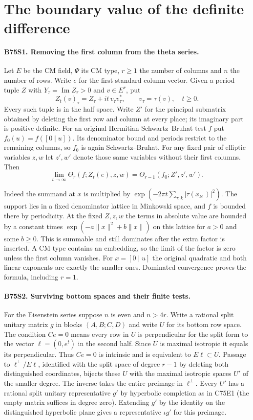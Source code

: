 \section{The boundary value of the definite difference}

\paragraph{B75S1. Removing the first column from the theta series.}
Let $E$ be the CM field, $\Psi$ its CM type, $r\ge1$ the number of
columns and $n$ the number of rows. Write $e$ for the first standard
column vector. Given a period tuple $Z$ with $Y_\tau=\operatorname{Im}
Z_\tau>0$ and $v\in E^r$, put
\[
   Z_t(v)_\tau=Z_\tau+it\,v_\tau v_\tau^*,\qquad
   v_\tau=\tau(v),\quad t\ge0.
\]
Every such tuple is in the half space. Write $Z'$ for the principal
submatrix obtained by deleting the first row and column at every place;
its imaginary part is positive definite. For an original Hermitian
Schwartz--Bruhat test $f$ put $f_0(u)=f([0\mid u])$. Its denominator
bound and periods restrict to the remaining columns, so $f_0$ is again
Schwartz--Bruhat. For any fixed pair of elliptic variables $z,w$ let
$z',w'$ denote those same variables without their first columns. Then
\[
   \lim_{t\to\infty}\Theta_r(f;Z_t(e),z,w)
           =\Theta_{r-1}(f_0;Z',z',w').
\]

Indeed the summand at $x$ is multiplied by
$\exp(-2\pi t\sum_{\tau,k}|\tau(x_{k1})|^2)$. The support lies in a
fixed denominator lattice in Minkowski space, and $f$ is bounded there
by periodicity. At the fixed $Z,z,w$ the terms in absolute value are
bounded by a constant times
$\exp(-a\|x\|^2+b\|x\|)$ on this lattice for $a>0$ and some $b\ge0$.
This is summable and still dominates after the extra factor is inserted.
A CM type contains an embedding, so the limit of the factor is zero
unless the first column vanishes. For $x=[0\mid u]$ the original
quadratic and both linear exponents are exactly the smaller ones.
Dominated convergence proves the formula, including $r=1$.

\paragraph{B75S2. Surviving bottom spaces and their finite tests.}
For the Eisenstein series suppose $n$ is even and $n>4r$. Write a
rational split unitary matrix $g$ in blocks $(A,B;C,D)$ and write
$U$ for its bottom row space. The condition $Ce=0$ means every row
in $U$ is perpendicular for the split form to the vector
$\ell=(0,e^t)$ in the second half. Since $U$ is maximal isotropic it
equals its perpendicular. Thus $Ce=0$ is intrinsic and is equivalent
to $E\ell\subset U$. Passage to $\ell^\perp/E\ell$, identified
with the split space of degree $r-1$ by deleting both distinguished
coordinates, bijects these $U$ with the maximal isotropic spaces $U'$
of the smaller degree. The inverse takes the entire preimage in
$\ell^\perp$. Every $U'$ has a rational split unitary representative
$g'$ by hyperbolic completion as in C75E1 (the empty matrix suffices
in degree zero). Extending $g'$ by the identity on the distinguished
hyperbolic plane gives a representative $\iota g'$ for this preimage.

